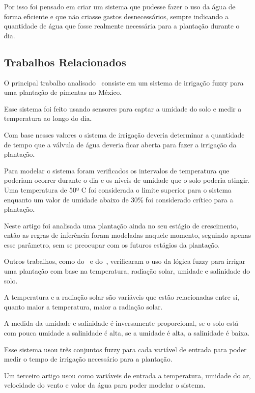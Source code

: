 \documentclass[
	article,			%
	11pt,				%
	oneside,			%
	a4paper,			%
	english,			%
	brazil,				%
	sumario=tradicional
	]{abntex2}
\begin{document}
\begin{multicols}{2}
Por isso foi pensado em criar um sistema que pudesse fazer o uso da água de forma eficiente e que não criasse gastos desnecessários, sempre indicando a quantidade de água que fosse realmente necessária para a plantação durante o dia.


\subsection{Trabalhos Relacionados}

O principal trabalho analisado~\cite{ceballos2015fuzzy} consiste em um sistema de irrigação fuzzy para uma plantação de pimentas no México.

Esse sistema foi feito usando sensores para captar a umidade do solo e medir a temperatura ao longo do dia.

Com base nesses valores o sistema de irrigação deveria determinar a quantidade de tempo que a válvula de água deveria ficar aberta para fazer a irrigação da plantação.

Para modelar o sistema foram verificados os intervalos de temperatura que poderiam ocorrer durante o dia e os níveis de umidade que o solo poderia atingir. Uma temperatura de 50º C foi considerada o limite superior para o sistema enquanto um valor de umidade abaixo de 30\% foi considerado crítico para a plantação.

Neste artigo foi analisada uma plantação ainda no seu estágio de crescimento, então as regras de inferência foram modeladas naquele momento, seguindo apenas esse parâmetro, sem se preocupar com os futuros estágios da plantação.

Outros trabalhos, como do~\cite{touati2013fuzzy} e do~\cite{giusti2015fuzzy}, verificaram o uso da lógica fuzzy para irrigar uma plantação com base na temperatura, radiação solar, umidade e salinidade do solo.

A temperatura e a radiação solar são variáveis que estão relacionadas entre si, quanto maior a temperatura, maior a radiação solar.

A medida da umidade e salinidade é inversamente proporcional, se o solo está com pouca umidade a salinidade é alta, se a umidade é alta, a salinidade é baixa.

Esse sistema usou três conjuntos fuzzy para cada variável de entrada para poder medir o tempo de irrigação necessário para a plantação.

Um terceiro artigo usou como variáveis de entrada a temperatura, umidade do ar, velocidade do vento e valor da água para poder modelar o sistema.


\end{multicols}
\end{document}
